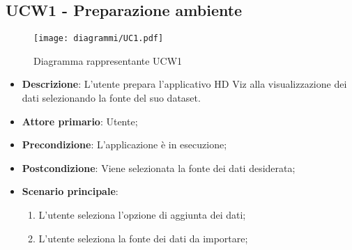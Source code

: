 \subsection{UCW1 - Preparazione ambiente}
\label{sub:ucw1}


\begin{figure}[h]
    \centering
    \texttt{[image: diagrammi/UC1.pdf]}
    \caption{Diagramma rappresentante UCW1}
    \label{fig:UCW1}
\end{figure}


\begin{itemize}
    \item \textbf{Descrizione}: L'utente prepara l'applicativo HD Viz alla visualizzazione dei dati selezionando la fonte del suo dataset.
	
    \item \textbf{Attore primario}: Utente;
        
    \item \textbf{Precondizione}:   L'applicazione è in esecuzione;

    \item \textbf{Postcondizione}:  Viene selezionata la fonte dei dati desiderata;

	\item \textbf{Scenario principale}:
		\begin{enumerate}
			\item L'utente seleziona l'opzione di aggiunta dei dati;
            \item L'utente seleziona la fonte dei dati da importare;
        \end{enumerate}
   
\end{itemize}


